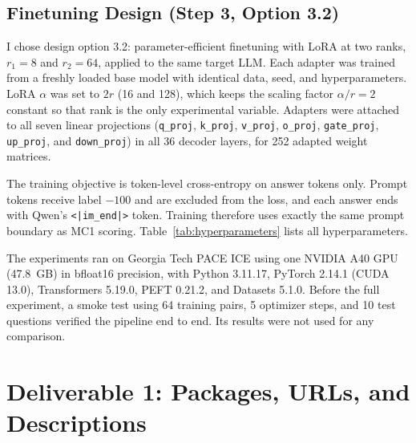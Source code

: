 \documentclass[11pt]{article}
\begin{document}
\subsection{Finetuning Design (Step 3, Option 3.2)}

I chose design option 3.2: parameter-efficient finetuning with LoRA at two ranks, $r_1 = 8$ and $r_2 = 64$, applied to the same target LLM. Each adapter was trained from a freshly loaded base model with identical data, seed, and hyperparameters. LoRA $\alpha$ was set to $2r$ (16 and 128), which keeps the scaling factor $\alpha/r = 2$ constant so that rank is the only experimental variable. Adapters were attached to all seven linear projections (\texttt{q\_proj}, \texttt{k\_proj}, \texttt{v\_proj}, \texttt{o\_proj}, \texttt{gate\_proj}, \texttt{up\_proj}, and \texttt{down\_proj}) in all 36 decoder layers, for 252 adapted weight matrices.

The training objective is token-level cross-entropy on answer tokens only. Prompt tokens receive label $-100$ and are excluded from the loss, and each answer ends with Qwen's \texttt{<|im\_end|>} token. Training therefore uses exactly the same prompt boundary as MC1 scoring. Table~\ref{tab:hyperparameters} lists all hyperparameters.

The experiments ran on Georgia Tech PACE ICE using one NVIDIA A40 GPU (47.8~GB) in bfloat16 precision, with Python 3.11.17, PyTorch 2.14.1 (CUDA 13.0), Transformers 5.19.0, PEFT 0.21.2, and Datasets 5.1.0. Before the full experiment, a smoke test using 64 training pairs, 5 optimizer steps, and 10 test questions verified the pipeline end to end. Its results were not used for any comparison.

\section{Deliverable 1: Packages, URLs, and Descriptions}
\end{document}
